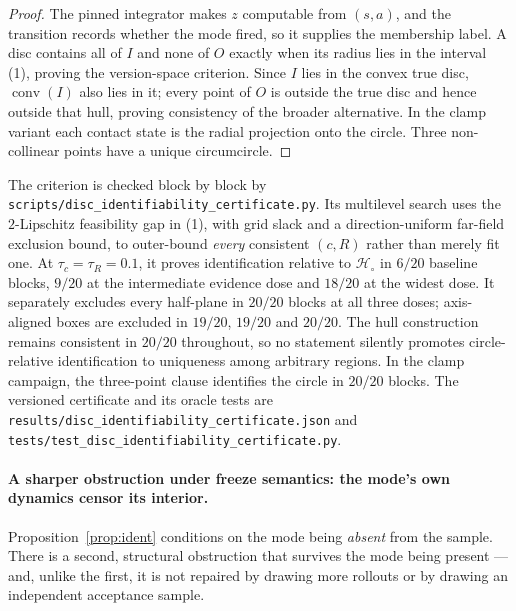 \documentclass[11pt]{article}
\theoremstyle{definition}
\theoremstyle{remark}
\begin{document}
\begin{proof}
The pinned integrator makes $z$ computable from $(s,a)$, and the transition records whether the mode fired, so it supplies the membership label. A disc contains all of $I$ and none of $O$ exactly when its radius lies in the interval (1), proving the version-space criterion. Since $I$ lies in the convex true disc, $\operatorname{conv}(I)$ also lies in it; every point of $O$ is outside the true disc and hence outside that hull, proving consistency of the broader alternative. In the clamp variant each contact state is the radial projection onto the circle. Three non-collinear points have a unique circumcircle.
\end{proof}

The criterion is checked block by block by \texttt{scripts/\allowbreak disc\_\allowbreak identifiability\_\allowbreak certificate.py}. Its multilevel search uses the $2$-Lipschitz feasibility gap in (1), with grid slack and a direction-uniform far-field exclusion bound, to outer-bound \emph{every} consistent $(c,R)$ rather than merely fit one. At $\tau_c=\tau_R=0.1$, it proves identification relative to $\mathcal H_{\circ}$ in $6/20$ baseline blocks, $9/20$ at the intermediate evidence dose and $18/20$ at the widest dose. It separately excludes every half-plane in $20/20$ blocks at all three doses; axis-aligned boxes are excluded in $19/20$, $19/20$ and $20/20$. The hull construction remains consistent in $20/20$ throughout, so no statement silently promotes circle-relative identification to uniqueness among arbitrary regions. In the clamp campaign, the three-point clause identifies the circle in $20/20$ blocks. The versioned certificate and its oracle tests are \texttt{results/\allowbreak disc\_\allowbreak identifiability\_\allowbreak certificate.json} and \texttt{tests/\allowbreak test\_\allowbreak disc\_\allowbreak identifiability\_\allowbreak certificate.py}.

\paragraph{A sharper obstruction under freeze semantics: the mode's own dynamics censor its interior.} Proposition~\ref{prop:ident} conditions on the mode being \emph{absent} from the sample. There is a second, structural obstruction that survives the mode being present --- and, unlike the first, it is not repaired by drawing more rollouts or by drawing an independent acceptance sample.
\end{document}
